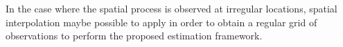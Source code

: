 \documentclass[10pt,twocolumn,twoside]{IEEEtran}
\begin{document}
{In the case where the spatial process is observed at irregular locations, spatial interpolation maybe possible to apply in order to obtain a regular grid of observations to perform the proposed estimation framework.




}
\end{document}
